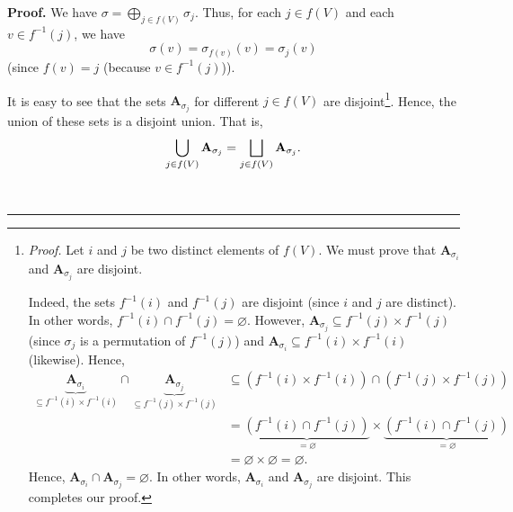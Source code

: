 \documentclass[numbers=enddot,12pt,final,onecolumn,notitlepage]{scrartcl}%
\numberwithin{exer}{section}
\theoremstyle{definition}
\newenvironment{proof}[1][Proof]{\noindent\textbf{#1.} }{\ \rule{0.5em}{0.5em}}
\let\cupnonlimits\bigcup
\let\sqcupnonlimits\bigsqcup
\let\oplusnonlimits\bigoplus
\renewcommand{\bigcup}{\cupnonlimits\limits}
\renewcommand{\bigsqcup}{\sqcupnonlimits\limits}
\renewcommand{\bigoplus}{\oplusnonlimits\limits}
\newenvironment{verlong}{}{}
\begin{document}
\begin{verlong}


\begin{proof}
We have $\sigma=\bigoplus_{j\in f\left(  V\right)  }\sigma_{j}$. Thus, for
each $j\in f\left(  V\right)  $ and each $v\in f^{-1}\left(  j\right)  $, we
have%
\begin{equation}
\sigma\left(  v\right)  =\sigma_{f\left(  v\right)  }\left(  v\right)
=\sigma_{j}\left(  v\right)  \label{pf.prop.level.Asig-f2.1}%
\end{equation}
(since $f\left(  v\right)  =j$ (because $v\in f^{-1}\left(  j\right)  $)).

It is easy to see that the sets $\mathbf{A}_{\sigma_{j}}$ for different $j\in
f\left(  V\right)  $ are disjoint\footnote{\textit{Proof.} Let $i$ and $j$ be
two distinct elements of $f\left(  V\right)  $. We must prove that
$\mathbf{A}_{\sigma_{i}}$ and $\mathbf{A}_{\sigma_{j}}$ are disjoint.
\par
Indeed, the sets $f^{-1}\left(  i\right)  $ and $f^{-1}\left(  j\right)  $ are
disjoint (since $i$ and $j$ are distinct). In other words, $f^{-1}\left(
i\right)  \cap f^{-1}\left(  j\right)  =\varnothing$. However, $\mathbf{A}%
_{\sigma_{j}}\subseteq f^{-1}\left(  j\right)  \times f^{-1}\left(  j\right)
$ (since $\sigma_{j}$ is a permutation of $f^{-1}\left(  j\right)  $) and
$\mathbf{A}_{\sigma_{i}}\subseteq f^{-1}\left(  i\right)  \times f^{-1}\left(
i\right)  $ (likewise). Hence,%
\begin{align*}
\underbrace{\mathbf{A}_{\sigma_{i}}}_{\subseteq f^{-1}\left(  i\right)  \times
f^{-1}\left(  i\right)  }\cap\underbrace{\mathbf{A}_{\sigma_{j}}}_{\subseteq
f^{-1}\left(  j\right)  \times f^{-1}\left(  j\right)  }  &  \subseteq\left(
f^{-1}\left(  i\right)  \times f^{-1}\left(  i\right)  \right)  \cap\left(
f^{-1}\left(  j\right)  \times f^{-1}\left(  j\right)  \right) \\
&  =\underbrace{\left(  f^{-1}\left(  i\right)  \cap f^{-1}\left(  j\right)
\right)  }_{=\varnothing}\times\underbrace{\left(  f^{-1}\left(  i\right)
\cap f^{-1}\left(  j\right)  \right)  }_{=\varnothing}\\
&  =\varnothing\times\varnothing=\varnothing.
\end{align*}
Hence, $\mathbf{A}_{\sigma_{i}}\cap\mathbf{A}_{\sigma_{j}}=\varnothing$. In
other words, $\mathbf{A}_{\sigma_{i}}$ and $\mathbf{A}_{\sigma_{j}}$ are
disjoint. This completes our proof.}. Hence, the union of these sets is a
disjoint union. That is,%
\[
\bigcup\limits_{j\in f\left(  V\right)  }\mathbf{A}_{\sigma_{j}}%
=\bigsqcup_{j\in f\left(  V\right)  }\mathbf{A}_{\sigma_{j}}.
\]



\end{proof}
\end{verlong}
\end{document}

